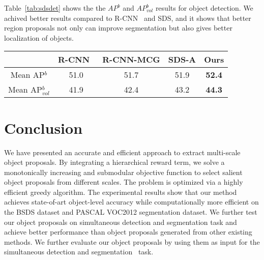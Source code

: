 \documentclass[10pt,twocolumn,letterpaper]{article}
\begin{document}
Table~\ref{tab:sdsdet} shows the the $AP^b$ and $AP^b_{vol}$ results for object detection. We achived better results compared to R-CNN~\cite{girshick14CVPR} and SDS, and it shows that better region proposals not only can improve segmentation but also gives better localization of objects. 
\begin{table*}[!htb]                               
\begin{center}
\begin{tabular}{|c|c|c|c|c|}                    
\hline                                          
 & R-CNN~\cite{girshick14CVPR} & R-CNN-MCG & SDS-A & Ours \\          
\hline                                          
Mean AP$^b$ & 51.0 & 51.7 & 51.9 & \textbf{52.4} \\        
\hline                                          
Mean AP$^b_{vol}$ & 41.9 & 42.4 & 43.2 & \textbf{44.3} \\
\hline                                          
\end{tabular}     
\end{center}                              
\caption{Results on AP$^b$ and AP$^b_{vol}$ on VOC2012 val. All numbers are $\%$}                        
\label{tab:sdsdet}                      
\end{table*}  

\section{Conclusion}
We have presented an accurate and efficient approach to extract multi-scale object proposals. By integrating a hierarchical reward term, we solve a monotonically increasing and submodular objective function to select salient object proposals from different scales. The problem is optimized via a highly efficient greedy algorithm. The experimental results show that our method achieves state-of-art object-level accuracy while computationally more efficient on the BSDS dataset and PASCAL VOC2012 segmentation dataset. We further test our object proposals on simultaneous detection and segmentation task and achieve better performance than object proposals generated from other existing methods. We further evaluate our object proposals by using them as input for the simultaneous detection and segmentation~\cite{Hariharan14} task. 

{\small


}
\end{document}
